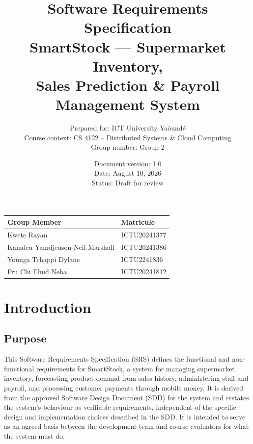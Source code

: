 \documentclass[11pt,a4paper]{report}
\title{
  {\color{navy}\Huge\bfseries Software Requirements Specification}\\[0.4cm]
  {\Large SmartStock --- Supermarket Inventory,\\ Sales Prediction \& Payroll Management System}
}
\author{
  Prepared for: ICT University Ya\'ound\'e \\
  Course context: CS 4122 -- Distributed Systems \& Cloud Computing \\
  Group number: Group 2
}
\date{Document version: 1.0 \\ Date: August 10, 2026 \\ Status: Draft for review}
\begin{document}
\maketitle

\thispagestyle{empty}
\vspace{1cm}
\begin{center}
\begin{tabular}{ll}
\toprule
\textbf{Group Member} & \textbf{Matricule} \\
\midrule
Kwete Rayan & ICTU20241377 \\
Kamdeu Yamdjeuson Neil Marshall  & ICTU20241386\\
Younga Tchappi Dylane  & ICTU2241836\\
Fru Chi Ehud Neba & ICTU20241812\\
\bottomrule
\end{tabular}
\end{center}

\newpage
\tableofcontents
\newpage

\chapter{Introduction}

\section{Purpose}
This Software Requirements Specification (SRS) defines the functional and non-functional requirements for SmartStock, a system for managing supermarket inventory, forecasting product demand from sales history, administering staff and payroll, and processing customer payments through mobile money. It is derived from the approved Software Design Document (SDD) for the system and restates the system's behaviour as verifiable requirements, independent of the specific design and implementation choices described in the SDD. It is intended to serve as an agreed basis between the development team and course evaluators for what the system must do.
\end{document}
